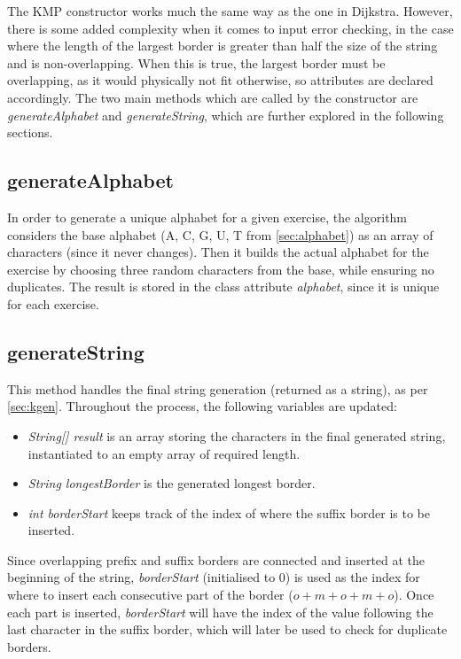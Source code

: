 \documentclass{l4proj}
\begin{document}
The KMP constructor works much the same way as the one in Dijkstra. However, there is some added complexity when it comes to input error checking, in the case where the length of the largest border is greater than half the size of the string and is non-overlapping. When this is true, the largest border must be overlapping, as it would physically not fit otherwise, so attributes are declared accordingly. The two main methods which are called by the constructor are \emph{generateAlphabet} and \emph{generateString}, which are further explored in the following sections.

\subsection{generateAlphabet}

In order to generate a unique alphabet for a given exercise, the algorithm considers the base alphabet (A, C, G, U, T from \autoref{sec:alphabet}) as an array of characters (since it never changes). Then it builds the actual alphabet for the exercise by choosing three random characters from the base, while ensuring no duplicates. The result is stored in the class attribute \emph{alphabet}, since it is unique for each exercise.

\subsection{generateString}

This method handles the final string generation (returned as a string), as per \autoref{sec:kgen}. Throughout the process, the following variables are updated:

\begin{itemize}
	\item
	\emph{String[] result} is an array storing the characters in the final generated string, instantiated to an empty array of required length.
	\item
	\emph{String longestBorder} is the generated longest border.
	\item
	\emph{int borderStart} keeps track of the index of where the suffix border is to be inserted.
\end{itemize}

Since overlapping prefix and suffix borders are connected and inserted at the beginning of the string, \emph{borderStart} (initialised to $0$) is used as the index for where to insert each consecutive part of the border ($o+m+o+m+o$). Once each part is inserted, \emph{borderStart} will have the index of the value following the last character in the suffix border, which will later be used to check for duplicate borders.
\end{document}
